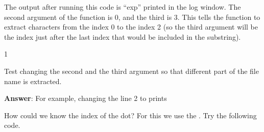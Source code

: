 The output after running this code is ``exp'' printed in the log window. The second argument of the function  is 0, and the third is 3. This tells the function  to extract characters from the index 0 to the index 2 (so the third argument will be the index just after the last index that would be included in the substring).

\begin{indentexercise}
{1}
	\item Test changing the second and the third argument so that different part of the file name is extracted.
	\item \textbf{Answer}: For example, changing the line 2 to  prints \ilcom{13\textunderscore}
\end{indentexercise}

How could we know the index of the dot? For this we use the . Try the following code.